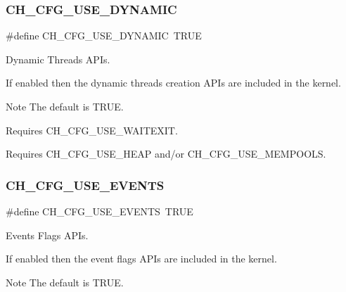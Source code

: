\subsubsection{\texorpdfstring{C\+H\+\_\+\+C\+F\+G\+\_\+\+U\+S\+E\+\_\+\+D\+Y\+N\+A\+M\+IC}{CH\_CFG\_USE\_DYNAMIC}}
{\footnotesize\ttfamily \#define C\+H\+\_\+\+C\+F\+G\+\_\+\+U\+S\+E\+\_\+\+D\+Y\+N\+A\+M\+IC~T\+R\+UE}



Dynamic Threads A\+P\+Is. 

If enabled then the dynamic threads creation A\+P\+Is are included in the kernel.

\begin{DoxyNote}{Note}
The default is {\ttfamily T\+R\+UE}. 

Requires {\ttfamily C\+H\+\_\+\+C\+F\+G\+\_\+\+U\+S\+E\+\_\+\+W\+A\+I\+T\+E\+X\+IT}. 

Requires {\ttfamily C\+H\+\_\+\+C\+F\+G\+\_\+\+U\+S\+E\+\_\+\+H\+E\+AP} and/or {\ttfamily C\+H\+\_\+\+C\+F\+G\+\_\+\+U\+S\+E\+\_\+\+M\+E\+M\+P\+O\+O\+LS}. 
\end{DoxyNote}
\hypertarget{group__config_ga1469eb9d4445e870ed1a45a841c10fb3}{}\label{group__config_ga1469eb9d4445e870ed1a45a841c10fb3} 
\subsubsection{\texorpdfstring{C\+H\+\_\+\+C\+F\+G\+\_\+\+U\+S\+E\+\_\+\+E\+V\+E\+N\+TS}{CH\_CFG\_USE\_EVENTS}}
{\footnotesize\ttfamily \#define C\+H\+\_\+\+C\+F\+G\+\_\+\+U\+S\+E\+\_\+\+E\+V\+E\+N\+TS~T\+R\+UE}



Events Flags A\+P\+Is. 

If enabled then the event flags A\+P\+Is are included in the kernel.

\begin{DoxyNote}{Note}
The default is {\ttfamily T\+R\+UE}. 
\end{DoxyNote}
\hypertarget{group__config_gad39f51eec096df2b73444e8fad5cfd11}{}\label{group__config_gad39f51eec096df2b73444e8fad5cfd11} 
